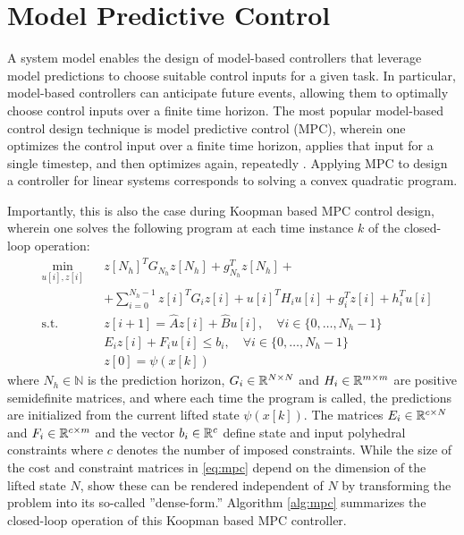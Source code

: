 \section{Model Predictive Control}
\label{sec:mpc}

A system model enables the design of model-based controllers that leverage model predictions to choose suitable control inputs for a given task.
In particular, model-based controllers can anticipate future events, allowing them to optimally choose control inputs over a finite time horizon.
The most popular model-based control design technique is model predictive control (MPC), wherein one optimizes the control input over a finite time horizon, applies that input for a single timestep, and then optimizes again, repeatedly \cite{rawlings2009model}.
Applying MPC to design a controller for linear systems corresponds to solving a convex quadratic program. 


Importantly, this is also the case during Koopman based MPC control design, wherein one solves the following program at each time instance $k$ of the closed-loop operation:
\begin{equation}
\begin{aligned}
& \underset{u[i] , z[i]}{\text{min}}
& & z[N_h]^{T} G_{N_h} z[N_h] + g_{N_h}^T z[N_h] +  \\
&&& + \sum_{i=0}^{N_h - 1} z[i]^T G_i z[i] + u[i]^T H_i u[i] + g_i^T z[i] + h_i^T u[i]\\
& \text{s.t.}
& & z[i+1] = \hat{A} z[i] + \hat{B} u[i] , \quad \forall i \in \{ 0 , \ldots , N_h - 1 \} \\
&&& E_i z[i] + F_i u[i] \leq b_i , \quad \forall i \in \{ 0 , \ldots , N_h - 1\} \\
&&& z[0] = \psi (x[k])
\end{aligned} \label{eq:mpc}
\end{equation}
where $N_h \in \mathbb{N}$ is the prediction horizon, $G_i \in \mathbb{R}^{N \times N}$ and $H_i \in \mathbb{R}^{m \times m}$ are positive semidefinite matrices, and where each time the program is called, the predictions are initialized from the current lifted state $\psi (x[k])$.
The matrices $E_i \in \mathbb{R}^{c \times N}$ and $F_i \in \mathbb{R}^{c \times m}$ and the vector $b_i \in \mathbb{R}^{c}$ define state and input polyhedral constraints where $c$ denotes the number of imposed constraints.
While the size of the cost and constraint matrices in \eqref{eq:mpc} depend on the dimension of the lifted state $N$, \citet{korda2018linear} show these can be rendered independent of $N$ by transforming the problem into its so-called ''dense-form.''
Algorithm \ref{alg:mpc} summarizes the closed-loop operation of this Koopman based MPC controller.

